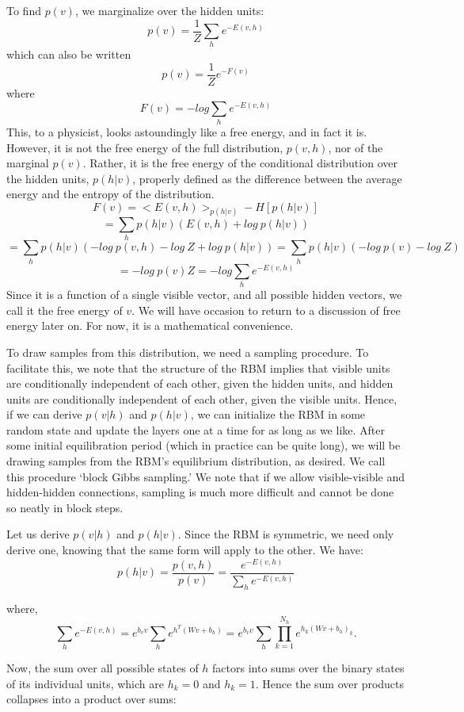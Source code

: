 \documentclass[11pt, oneside]{article}   	%
\begin{document}
To find $p(v)$, we marginalize over the hidden units:
$$p(v) = \frac{1}{Z} \sum_h e^{-E(v, h)}$$
which can also be written
 $$p(v) = \frac{1}{Z}e^{-F(v)}$$
where 
 $$F(v) = - log \sum_h e^{-E(v,h)}$$  This, to a physicist, looks astoundingly like a free energy, and in fact it is.  However, it is not the free energy of the full distribution, $p(v,h)$, nor of the marginal $p(v)$.  Rather, it is the free energy of the conditional distribution over the hidden units, $p(h|v)$, properly defined as the difference between the average energy and the entropy of the distribution.  
 $$F(v) = < E(v,h) >_{p(h|v)} - H[p(h|v)]$$
$$= \sum_h p(h | v) (E(v,h) + log\ p(h|v))$$
$$= \sum_h p(h | v) (-log\ p(v,h) - log\ Z + log\ p(h|v)) = \sum_h p(h | v) (-log\ p(v) - log\ Z) $$
$$= - log\ p(v)Z =  - log \sum_h e^{-E(v,h)}$$
 Since it is a function of a single visible vector, and all possible hidden vectors, we call it the free energy of $v$.  We will have occasion to return to a discussion of free energy later on.  For now, it is a mathematical convenience.
 
To draw samples from this distribution, we need a sampling procedure.  To facilitate this, we note that the structure of the RBM implies that visible units are conditionally independent of each other, given the hidden units, and hidden units are conditionally independent of each other, given the visible units.  Hence, if we can derive $p(v | h)$ and $p(h | v)$, we can initialize the RBM in some random state and update the layers one at a time for as long as we like.  After some initial equilibration period (which in practice can be quite long), we will be drawing samples from the RBM's equilibrium distribution, as desired.  We call this procedure `block Gibbs sampling.'  We note that if we allow visible-visible and hidden-hidden connections, sampling is much more difficult and cannot be done so neatly in block steps.

Let us derive $p(v | h)$ and $p(h | v)$.  Since the RBM is symmetric, we need only derive one, knowing that the same form will apply to the other.  We have:
$$p(h | v) = \frac {p(v,h)}{p(v)}
=\frac { e^{-E(v,h)} } { \sum_h e^{-E(v,h)}}$$ 

where,
$$ \sum_h e^{-E(v,h)} = e^{b_v v}\sum_h e^{h^T(Wv + b_h)}
=  e^{b_v v}\sum_h \prod_{k=1}^{N_h} e^{h_k(Wv + b_h)_k}.$$

Now, the sum over all possible states of $h$ factors into sums over the binary states of its individual units, which are $h_k = 0$ and $h_k = 1$.  Hence the sum over products collapses into a product over sums:
\end{document}
